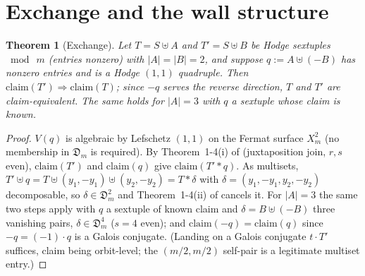 \documentclass[11pt]{amsart}
\newtheorem{theorem}{Theorem}[section]
\theoremstyle{remark}
\begin{document}
\section{Exchange and the wall structure}\label{sec:exchange}

\begin{theorem}[Exchange]\label{thm:exchange}
Let $T=S\uplus A$ and $T'=S\uplus B$ be Hodge sextuples $\bmod\ m$ (entries nonzero) with
$|A|=|B|=2$, and suppose $q:=A\uplus(-B)$ has nonzero entries and is a Hodge $(1,1)$ quadruple.
Then $\mathrm{claim}(T')\Rightarrow\mathrm{claim}(T)$; since $-q$ serves the reverse direction,
$T$ and $T'$ are \emph{claim-equivalent}. The same holds for $|A|=3$ with $q$ a sextuple whose
claim is known.
\end{theorem}
\begin{proof}
$V(q)$ is algebraic by Lefschetz $(1,1)$ on the Fermat surface $X^2_m$ (no membership in
$\mathfrak D_m$ is required). By Theorem~1-4(i) of \cite{Aoki87} (juxtaposition join, $r,s$ even),
$\mathrm{claim}(T')$ and $\mathrm{claim}(q)$ give $\mathrm{claim}(T'\ast q)$. As multisets,
$T'\uplus q = T\uplus(y_1,-y_1)\uplus(y_2,-y_2) = T\ast\delta$ with
$\delta=(y_1,-y_1,y_2,-y_2)$ decomposable, so $\delta\in\mathfrak D^2_m$ and Theorem~1-4(ii) of
\cite{Aoki87} cancels it. For $|A|=3$ the same two steps apply with $q$ a sextuple of known claim
and $\delta=B\uplus(-B)$ three vanishing pairs, $\delta\in\mathfrak D^4_m$ ($s=4$ even); and
$\mathrm{claim}(-q)=\mathrm{claim}(q)$ since $-q=(-1)\cdot q$ is a Galois conjugate. (Landing on a
Galois conjugate $t\cdot T'$ suffices, claim being orbit-level; the
$(m/2,m/2)$ self-pair is a legitimate multiset entry.)
\end{proof}
\end{document}
